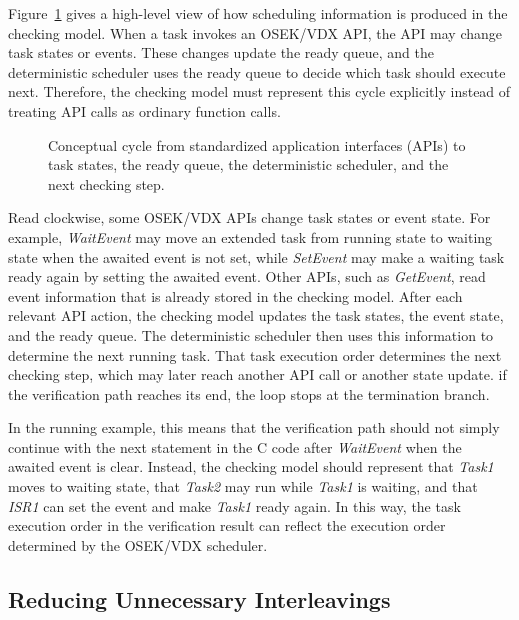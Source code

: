 Figure~\ref{fig:osek-sequence} gives a high-level view of how scheduling information is produced in the checking model. When a task invokes an OSEK/VDX API, the API may change task states or events. These changes update the ready queue, and the deterministic scheduler uses the ready queue to decide which task should execute next. Therefore, the checking model must represent this cycle explicitly instead of treating API calls as ordinary function calls.

\begin{figure}[H]
  \centering
  
  \caption{Conceptual cycle from standardized application interfaces (APIs) to task states,
  the ready queue, the deterministic scheduler, and the next checking step.}
  \label{fig:osek-sequence}
\end{figure}

Read clockwise, some OSEK/VDX APIs change task states or event state. For example, \textit{WaitEvent} may move an extended task from running state to waiting state when the awaited event is not set, while \textit{SetEvent} may make a waiting task ready again by setting the awaited event. Other APIs, such as \textit{GetEvent}, read event information that is already stored in the checking model. After each relevant API action, the checking model updates the task states, the event state, and the ready queue. The deterministic scheduler then uses this information to determine the next running task. That task execution order determines the next checking step, which may later reach another API call or another state update. if the verification path reaches its end, the loop stops at the termination branch.

In the running example, this means that the verification path should not simply continue with the next statement in the C code after \textit{WaitEvent} when the awaited event is clear. Instead, the checking model should represent that \textit{Task1} moves to waiting state, that \textit{Task2} may run while \textit{Task1} is waiting, and that \textit{ISR1} can set the event and make \textit{Task1} ready again. In this way, the task execution order in the verification result can reflect the execution order determined by the OSEK/VDX scheduler.

\subsection{Reducing Unnecessary Interleavings}
\label{sec:method-interleavings}

